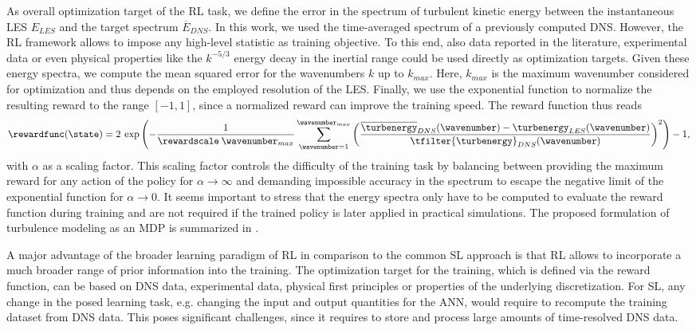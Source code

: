 As overall optimization target of the RL task, we define the error in the spectrum of turbulent kinetic energy between the instantaneous LES $E_{LES}$ and the target spectrum $\overline{E}_{DNS}$.
In this work, we used the time-averaged spectrum of a previously computed DNS.
However, the RL framework allows to impose any high-level statistic as training objective.
To this end, also data reported in the literature, experimental data or even physical properties like the $k^{-5/3}$ energy decay in the inertial range could be used directly as optimization targets. 
Given these energy spectra, we compute the mean squared error for the wavenumbers $k$ up to $k_{max}$.
Here, $k_{max}$ is the maximum wavenumber considered for optimization and thus depends on the employed resolution of the LES.
Finally, we use the exponential function to normalize the resulting reward to the range $[-1,1]$, since a normalized reward can improve the training speed.
The reward function thus reads
\begin{equation}
  \rewardfunc(\state) = 2\:\exp\left(-\frac{1}{\rewardscale\:\wavenumber_{max}}\sum_{\wavenumber=1}^{\wavenumber_{max}}\left(\frac{\overline{\turbenergy}_{DNS}(\wavenumber)-\turbenergy_{LES}(\wavenumber)}{\tfilter{\turbenergy}_{DNS}(\wavenumber)}\right)^2\right)-1,
  \label{eq:reward}
\end{equation}
with $\alpha$ as a scaling factor.
This scaling factor controls the difficulty of the training task by balancing between providing the maximum reward for any action of the policy for $\alpha \rightarrow \infty$ and demanding impossible accuracy in the spectrum to escape the negative limit of the exponential function for $\alpha \rightarrow 0$.
It seems important to stress that the energy spectra only have to be computed to evaluate the reward function during training and are not required if the trained policy is later applied in practical simulations.
The proposed formulation of turbulence modeling as an MDP is summarized in .

A major advantage of the broader learning paradigm of RL in comparison to the common SL approach is that RL allows to incorporate a much broader range of prior information into the training.
The optimization target for the training, which is defined via the reward function, can be based on DNS data, experimental data, physical first principles or properties of the underlying discretization.
For SL, any change in the posed learning task, e.g. changing the input and output quantities for the ANN, would require to recompute the training dataset from DNS data.
This poses significant challenges, since it requires to store and process large amounts of time-resolved DNS data.



